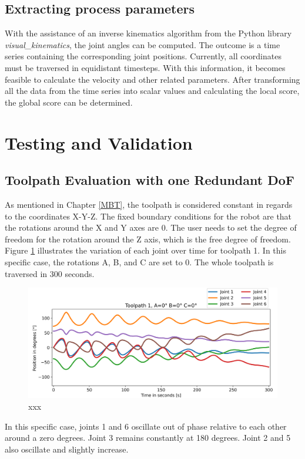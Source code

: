 \subsection{Extracting process parameters}
With the assistance of an inverse kinematics algorithm from the Python library \textit{visual\_kinematics}, the joint angles can be computed. The outcome is a time series containing the corresponding joint positions. Currently, all coordinates must be traversed in equidistant timesteps. With this information, it becomes feasible to calculate the velocity and other related parameters. After transforming all the data from the time series into scalar values and calculating the local score, the global score can be determined.
\newpage
\section{Testing and Validation}%

\subsection{Toolpath Evaluation with one Redundant DoF}
As mentioned in Chapter \ref{MBT}, the toolpath is considered constant in regards to the coordinates X-Y-Z. The fixed boundary conditions for the robot are that the rotations around the X and Y axes are 0. The user needs to set the degree of freedom for the rotation around the Z axis, which is the free degree of freedom. Figure \ref{TP1ABC0} illustrates the variation of each joint over time for toolpath 1. In this specific case, the rotations A, B, and C are set to 0. The whole toolpath is traversed in 300 seconds. 

\begin{figure}[H]
	\centerline{\includegraphics[width=1\textwidth]{figures/TP1ABC0.png}}
	\caption{xxx}
	\label{TP1ABC0}
\end{figure}
In this specific case, joints 1 and 6 oscillate out of phase relative to each other around a zero degrees. Joint 3 remains constantly at 180 degrees. Joint 2 and 5 also oscillate and slightly increase.


